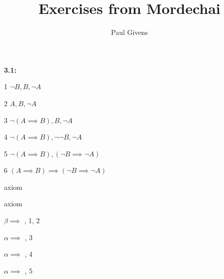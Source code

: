 \documentclass[letterpaper]{article}
\title{Exercises from Mordechai}
\author{Paul Givens}
\begin{document}
\maketitle

\textbf{3.1:}

\begin{minipage}[t]{0.6\textwidth}
1 $\neg B, B, \neg A$

2 $A, B, \neg A$

3 $\neg (A \implies B), B, \neg A$ 

4 $\neg (A \implies B), \neg \neg B, \neg A$

5 $\neg (A \implies B), (\neg B \implies \neg A)$

6 $ (A \implies B) \implies (\neg B \implies \neg A) $
\end{minipage}
\begin{minipage}[t]{0.4\textwidth}
axiom

axiom

$\beta \implies$  , 1, 2

$\alpha \implies$ , 3

$\alpha \implies$ , 4

$\alpha \implies$ , 5
\end{minipage}
\end{document}
